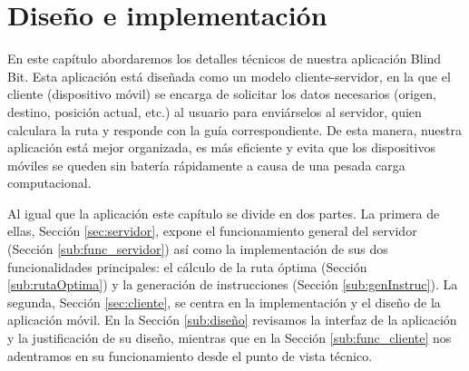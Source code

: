 \chapter{Diseño e implementación}
\label{cap:diseñoeimplementación}


En este capítulo abordaremos los detalles técnicos de nuestra aplicación Blind Bit. Esta aplicación está diseñada como un modelo cliente-servidor, en la que el cliente (dispositivo móvil) se encarga de solicitar los datos necesarios (origen, destino, posición actual, etc.) al usuario para enviárselos al servidor, quien calculara la ruta y responde con la guía correspondiente. De esta manera, nuestra aplicación está mejor organizada, es más eficiente y evita que los dispositivos móviles se queden sin batería rápidamente a causa de una pesada carga computacional.

Al igual que la aplicación este capítulo se divide en dos partes. La primera de ellas, Sección \ref{sec:servidor}, expone el funcionamiento general del servidor (Sección \ref{sub:func_servidor}) así como la implementación de sus dos funcionalidades principales: el cálculo de la ruta óptima (Sección \ref{sub:rutaOptima}) y la generación de instrucciones (Sección \ref{sub:genInstruc}). La segunda, Sección \ref{sec:cliente}, se centra en la implementación y el diseño de la aplicación móvil. En la Sección \ref{sub:diseño} revisamos la interfaz de la aplicación y la justificación de su diseño, mientras que en la Sección \ref{sub:func_cliente} nos adentramos en su funcionamiento desde el punto de vista técnico.



